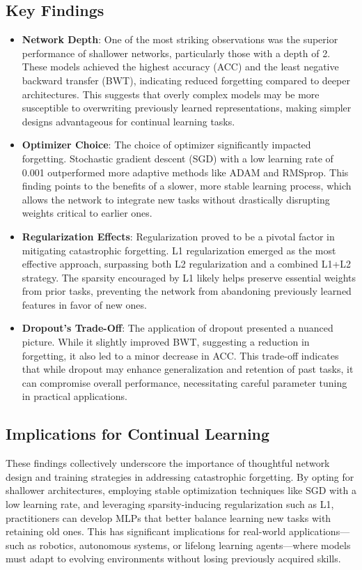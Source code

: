 \documentclass{article}
\begin{document}
\subsection{Key Findings}
\begin{itemize}
    \item \textbf{Network Depth}: One of the most striking observations was the superior performance of shallower networks, particularly those with a depth of 2. These models achieved the highest accuracy (ACC) and the least negative backward transfer (BWT), indicating reduced forgetting compared to deeper architectures. This suggests that overly complex models may be more susceptible to overwriting previously learned representations, making simpler designs advantageous for continual learning tasks.
    
    \item \textbf{Optimizer Choice}: The choice of optimizer significantly impacted forgetting. Stochastic gradient descent (SGD) with a low learning rate of 0.001 outperformed more adaptive methods like ADAM and RMSprop. This finding points to the benefits of a slower, more stable learning process, which allows the network to integrate new tasks without drastically disrupting weights critical to earlier ones.
    
    \item \textbf{Regularization Effects}: Regularization proved to be a pivotal factor in mitigating catastrophic forgetting. L1 regularization emerged as the most effective approach, surpassing both L2 regularization and a combined L1+L2 strategy. The sparsity encouraged by L1 likely helps preserve essential weights from prior tasks, preventing the network from abandoning previously learned features in favor of new ones.
    
    \item \textbf{Dropout’s Trade-Off}: The application of dropout presented a nuanced picture. While it slightly improved BWT, suggesting a reduction in forgetting, it also led to a minor decrease in ACC. This trade-off indicates that while dropout may enhance generalization and retention of past tasks, it can compromise overall performance, necessitating careful parameter tuning in practical applications.
\end{itemize}

\subsection{Implications for Continual Learning}
These findings collectively underscore the importance of thoughtful network design and training strategies in addressing catastrophic forgetting. By opting for shallower architectures, employing stable optimization techniques like SGD with a low learning rate, and leveraging sparsity-inducing regularization such as L1, practitioners can develop MLPs that better balance learning new tasks with retaining old ones. This has significant implications for real-world applications—such as robotics, autonomous systems, or lifelong learning agents—where models must adapt to evolving environments without losing previously acquired skills.
\end{document}
